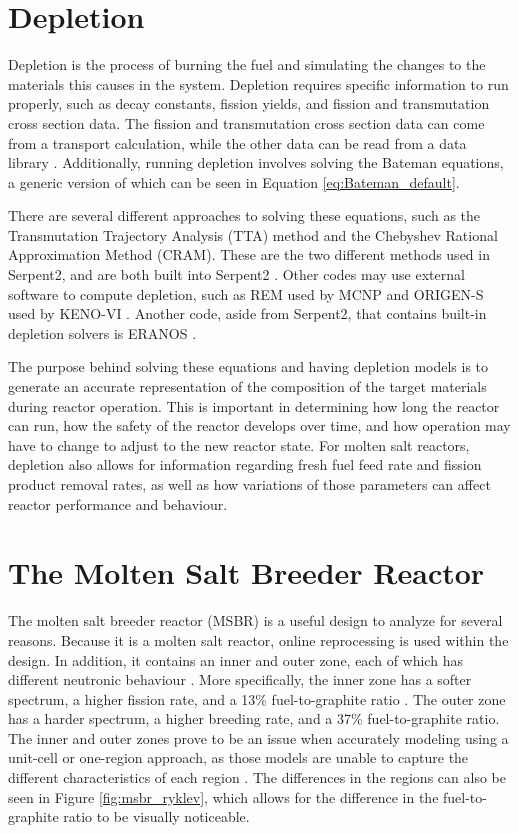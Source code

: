 \section{Depletion}

Depletion is the process of burning the fuel and simulating the changes to the materials this causes in the system. Depletion requires specific information to run properly, such as decay constants,  fission yields, and fission and transmutation cross section data. The fission and transmutation cross section data can come from a transport calculation, while the other data can be read from a data library \cite{leppanen_development_2007}. Additionally, running depletion involves solving the Bateman equations, a generic version of which can be seen in Equation \ref{eq:Bateman_default}.

There are several different approaches to solving these equations, such as the Transmutation Trajectory Analysis (TTA) method and the Chebyshev Rational Approximation Method (CRAM). These are the two different methods used in Serpent2, and are both built into Serpent2 \cite{leppanen_serpent_2015}. Other codes may use external software to compute depletion, such as REM used by MCNP and ORIGEN-S used by KENO-VI \cite{aufiero_extended_2013}. Another code, aside from Serpent2, that contains built-in depletion solvers is ERANOS \cite{aufiero_extended_2013}.

The purpose behind solving these equations and having depletion models is to generate an accurate representation of the composition of the target materials during reactor operation. This is important in determining how long the reactor can run, how the safety of the reactor develops over time, and how operation may have to change to adjust to the new reactor state. For molten salt reactors, depletion also allows for information regarding fresh fuel feed rate and fission product removal rates, as well as how variations of those parameters can affect reactor performance and behaviour.

\section{The Molten Salt Breeder Reactor}

The molten salt breeder reactor (MSBR) is a useful design to analyze for several reasons. Because it is a molten salt reactor, online reprocessing is used within the design. In addition, it contains an inner and outer zone, each of which has different neutronic behaviour \cite{robertson_conceptual_1971}. More specifically, the inner zone has a softer spectrum, a higher fission rate, and a 13\% fuel-to-graphite ratio \cite{park_whole_2015}. The outer zone has a harder spectrum, a higher breeding rate, and a 37\% fuel-to-graphite ratio. The inner and outer zones prove to be an issue when accurately modeling using a unit-cell or one-region approach, as those models are unable to capture the different characteristics of each region \cite{rykhlevskii_modeling_2019}. The differences in the regions can also be seen in Figure \ref{fig:msbr_ryklev}, which allows for the difference in the fuel-to-graphite ratio to be visually noticeable.

